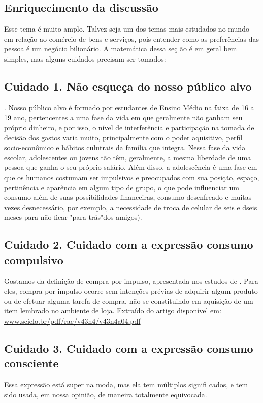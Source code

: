 \begin{paginatexto}
\section*{Enriquecimento da discussão}

Esse tema é muito amplo. Talvez seja um dos temas mais estudados no mundo em relação ao comércio de bens e serviços, pois entender como as preferências das pessoa é um negócio bilionário. A matemática dessa seç ão é em geral bem simples, mas alguns cuidados precisam ser tomados:


\subsection{Cuidado 1. Não esqueça do nosso público alvo}. Nosso público alvo é formado por estudantes de Ensino Médio na faixa de 16 a 19 ano, pertencentes a uma fase da vida em que geralmente não ganham seu próprio dinheiro, e por isso, o nível de interferência e participação na tomada de decisão dos gastos varia muito, principalmente com o poder aquisitivo, perfil socio-econômico e hábitos culutrais da família que integra. Nessa fase da vida escolar, adolescentes ou jovens tão têm, geralmente, a mesma liberdade de uma pessoa que ganha o seu próprio salário. Além disso, a adolescência é uma fase em que os humanos costumam ser impulsivos \citep{fonseca2005} e preocupados com sua posição, espaço, pertinência e aparência em algum tipo de grupo, o que pode influenciar um consumo além de suas possibilidades financeiras, consumo desenfreado e muitas vezes desnecessário, por exemplo, a necessidade de troca de celular de seis e dseis meses para não ficar "para trás"{}dos amigos).


\subsection{Cuidado 2. Cuidado com a expressão consumo compulsivo}

Gostamos da definição de compra por impulso, apresentada nos estudos de \cite{BEATTY1998}. Para eles, compra por impulso ocorre sem intenções prévias de adquirir algum produto ou de efetuar alguma tarefa de compra, não se constituindo em aquisição de um item lembrado no ambiente de loja. Extraído do artigo disponível em: \url{www.scielo.br/pdf/rae/v43n4/v43n4a04.pdf}


\subsection{Cuidado 3. Cuidado com a expressão consumo consciente} Essa expressão está super na moda, mas ela tem múltiplos signifi cados, e tem sido usada, em nossa opinião, de maneira totalmente equivocada.


\end{paginatexto}
